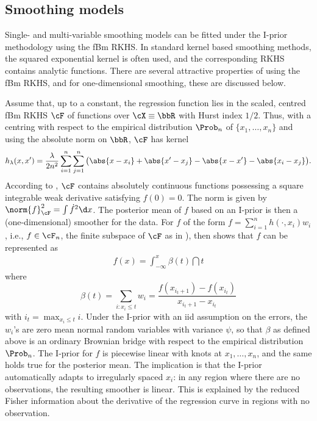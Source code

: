 \subsection{Smoothing models}

Single- and multi-variable smoothing models can be fitted under the I-prior methodology using the fBm RKHS.
In standard kernel based smoothing methods, the squared exponential kernel is often used, and the corresponding RKHS contains analytic functions.
There are several attractive properties of using the fBm RKHS, and for one-dimensional smoothing, these are discussed below.

Assume that, up to a constant, the regression function lies in the scaled, centred fBm RKHS $\cF$ of functions over $\cX \equiv \bbR$ with Hurst index $1/2$.
Thus, with a centring with respect to the empirical distribution $\Prob_n$ of $\{x_1,\dots,x_n\}$ and using the absolute norm on $\bbR$, $\cF$ has kernel
\[
  h_\lambda(x,x') = \frac{\lambda}{2n^2} \sum_{i=1}^n\sum_{j=1}^n \big( \abs{x-x_i} + \abs{x'-x_j} - \abs{x-x'} - \abs{x_i-x_j} \big).
\]
According to \citet[Section 10]{van2008reproducing}, $\cF$ contains absolutely continuous functions possessing a square integrable weak derivative satisfying $f(0)=0$.
The norm is given by $\norm{f}^2_\cF = \int \dot f^2 \d x$.
The posterior mean of $f$ based on an I-prior is then a (one-dimensional) smoother for the data.
For $f$ of the form $f = \sum_{i=1}^n h(\cdot,x_i)w_i$, i.e., $f\in\cF_n$, the finite subspace of $\cF$ as in ), then \citep{bergsma2017} shows that $f$ can be represented as 
\begin{align}\label{eq:ipriorbrownianbridge}
  f(x) = \int_{-\infty}^x \beta(t) \dint t
\end{align}
where 
\[
  \beta(t) = \sum_{i:x_i \leq t} w_i =  \frac{f(x_{i_t + 1}) - f(x_{i_t})}{x_{i_t + 1} - x_{i_t}}
\]
with $i_t = \max_{x_i \leq t} i$.
Under the I-prior with an iid assumption on the errors, the $w_i$'s are zero mean normal random variables with variance $\psi$, so that $\beta$ as defined above is an ordinary Brownian bridge with respect to the empirical distribution $\Prob_n$.
The I-prior for $f$ is piecewise linear with knots at $x_1,\dots,x_n$, and the same holds true for the posterior mean.
The implication is that the I-prior automatically adapts to irregularly spaced $x_i$: in any region where there are no observations, the resulting smoother is linear.
This is explained by the reduced Fisher information about the derivative of the regression curve in regions with no observation.

